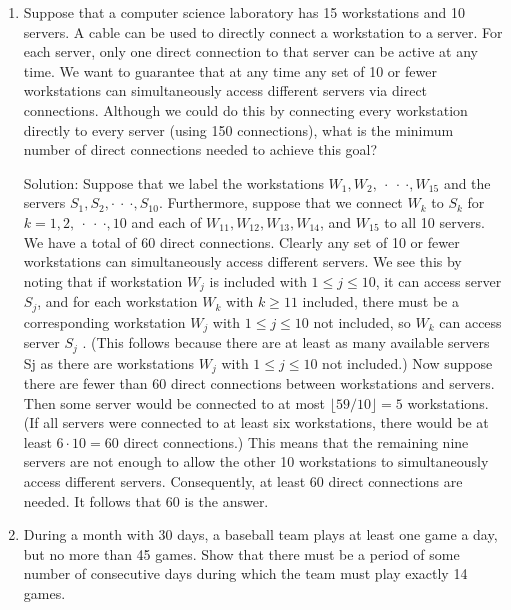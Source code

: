 \documentclass[11pt,a4paper]{book}
\begin{document}
\begin{enumerate}[label=Example~\arabic*]
\item Suppose that a computer science laboratory has 15 workstations and 10 servers.
A cable can be used to directly connect a workstation to a server.
For each server, only one direct connection to that server can be active at any time.
We want to guarantee that at any time any set of 10 or fewer workstations can simultaneously access different servers via direct connections.
Although we could do this by connecting every workstation directly to every server (using 150 connections), what is the minimum number of direct connections needed to achieve this goal?

Solution: Suppose that we label the workstations \emph{$W_1,W_2, ~\cdot~\cdot~\cdot , W_{15}$} and the servers \emph{$S_1, S_2, \cdot~\cdot~\cdot , S_{10}$}.
Furthermore, suppose that we connect $W_k$ to $S_k$ for \emph{$k = 1, 2,~\cdot~\cdot~\cdot , 10$} and each of $W_{11},W_{12},W_{13},W_{14}$, and $W_{15}$ to all 10 servers.
We have a total of 60 direct connections.
Clearly any set of 10 or fewer workstations can simultaneously access different servers.
We see this by noting that if workstation $W_j$ is included with $1 \leq j \leq 10$, it can access server $S_j$, and for each workstation $W_k$ with $k \geq 11$ included, there must be a corresponding workstation $W_j$ with $1 \leq j \leq 10$ not included, so $W_k$ can access server $S_j$ . (This follows because there are at least as many available servers Sj as there are workstations $W_j$ with $1 \leq j \leq 10$ not included.)
Now suppose there are fewer than 60 direct connections between workstations and servers.
Then some server would be connected to at most $\lfloor 59/10\rfloor = 5$ workstations. (If all servers were connected to at least six workstations, there would be at least $6 \cdot 10 = 60$ direct connections.)
This means that the remaining nine servers are not enough to allow the other 10 workstations to simultaneously access different servers.
Consequently, at least 60 direct connections are needed.
It follows that 60 is the answer.

\item During a month with 30 days, a baseball team plays at least one game a day, but no more than 45 games. 
Show that there must be a period of some number of consecutive days during which the team must play exactly 14 games.


\end{enumerate}
\end{document}
